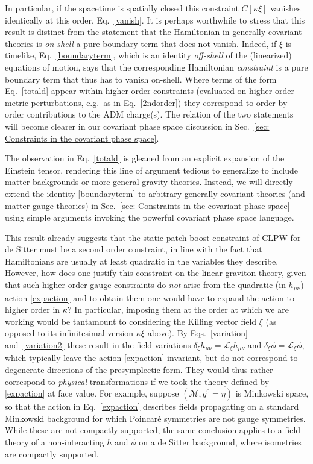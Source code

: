 \documentclass[]{jkpaper}
\theoremstyle{plain}
\theoremstyle{definition}
\begin{document}
In particular, if the spacetime is spatially  closed this constraint $C[\kappa\xi]$ vanishes identically at this order, Eq.~\eqref{vanish}. It is perhaps worthwhile to stress that this result is distinct from the statement that the Hamiltonian in generally covariant theories is \emph{on-shell} a pure boundary term that does not vanish. Indeed,  if $\xi$ is timelike, Eq.~\eqref{boundaryterm}, which is an identity \emph{off-shell} of the (linearized) equations of motion, says that the corresponding Hamiltonian \emph{constraint} is a pure boundary term that thus has to vanish on-shell. Where terms of the form Eq.~\eqref{totald} appear within higher-order constraints (evaluated on higher-order metric perturbations, e.g.\ as in Eq.~\eqref{2ndorder}) they correspond to order-by-order contributions to the ADM charge(s). The relation of the two statements will become clearer in our covariant phase space discussion in Sec.~\ref{sec: Constraints in the covariant phase space}.

The observation in Eq.~\eqref{totald} is gleaned from an explicit expansion of the Einstein tensor, rendering this line of argument tedious to generalize to include matter backgrounds or more general gravity theories. Instead, we will directly extend the identity \eqref{boundaryterm} to arbitrary generally covariant theories (and matter gauge theories) in Sec.~\ref{sec: Constraints in the covariant phase space} using simple arguments invoking the powerful covariant phase space language.


This result already suggests that the static patch boost constraint of CLPW for de Sitter must be a second order constraint, in line with the fact that Hamiltonians are usually at least quadratic in the variables they describe. However, how does one justify this constraint on the linear graviton theory, given that such higher order gauge constraints do \emph{not} arise from the quadratic (in $h_{\mu \nu}$) action \eqref{expaction} and to obtain them one would have to expand the action to higher order in $\kappa$? In particular, imposing them at the order at which we are working would be tantamount to considering the Killing vector field $\xi$ (as opposed to its infinitesimal version $\kappa\xi$ above). By Eqs.\ \eqref{variation} and~\eqref{variation2} these result in the field variations
$\delta_\xi h_{\mu \nu}=\mathcal L_\xi h_{\mu \nu}$ and $\delta_\xi\phi=\mathcal L_\xi \phi$, which typically leave the action \eqref{expaction} invariant, but do not correspond to degenerate directions of the presymplectic form. They would thus rather correspond to \emph{physical} transformations 
if we took the theory defined by \eqref{expaction} at face value. For example, suppose $(\mathcal{M},g^0=\eta)$ is Minkowski space, so that the action in Eq.~\eqref{expaction} describes fields propagating on a standard Minkowski background for which Poincar\'e symmetries are not gauge symmetries. While these are not compactly supported, the same conclusion applies to a  field theory of a non-interacting $h$ and $\phi$ on a de Sitter background, where isometries are compactly supported.
\end{document}
